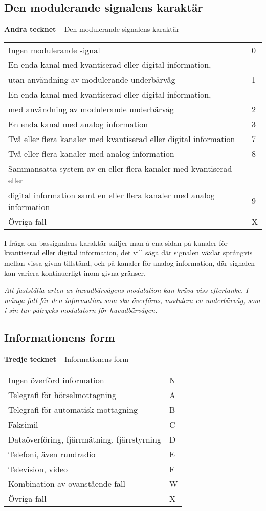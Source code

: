 \subsection{Den modulerande signalens karaktär}
\textbf{Andra tecknet} -- Den modulerande signalens karaktär\\
\begin{tabular}{ll}
	Ingen modulerande signal & 0\\
	En enda kanal med kvantiserad eller digital information, &\\
	utan användning av modulerande underbärvåg & 1\\
	En enda kanal med kvantiserad eller digital information, &\\
	med användning av modulerande underbärvåg & 2\\
	En enda kanal med analog information & 3\\
	Två eller flera kanaler med kvantiserad eller digital information & 7\\
	Två eller flera kanaler med analog information & 8\\
	Sammansatta system av en eller flera kanaler med kvantiserad eller & \\
	digital information samt en eller flera kanaler med analog information & 9\\
	Övriga fall & X\\
\end{tabular}

I fråga om bassignalens karaktär skiljer man å ena sidan på kanaler för
kvantiserad eller digital information, det vill säga där signalen växlar
språngvis mellan vissa givna tillstånd, och på kanaler för analog information,
där signalen kan variera kontinuerligt inom givna gränser.

\emph{Att fastställa arten av huvudbärvågens modulation kan kräva viss
  eftertanke.
  I många fall får den information som ska överföras, modulera en underbärvåg,
  som i sin tur påtrycks modulatorn för huvudbärvågen.}

\subsection{Informationens form}
\textbf{Tredje tecknet} -- Informationens form\\
\begin{tabular}{ll}
	Ingen överförd information & N\\
	Telegrafi för hörselmottagning & A\\
	Telegrafi för automatisk mottagning & B\\
	Faksimil & C\\
	Dataöverföring, fjärrmätning, fjärrstyrning & D\\
	Telefoni, även rundradio & E\\
	Television, video & F\\
	Kombination av ovanstående fall & W\\
	Övriga fall & X\\
\end{tabular}


